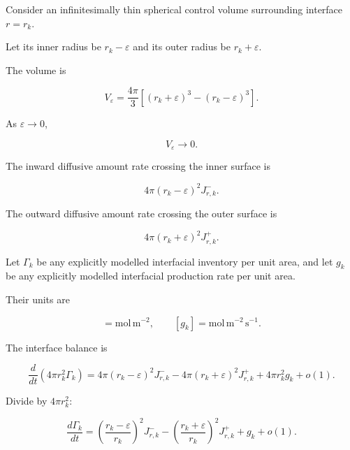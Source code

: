 \documentclass[11pt,a4paper]{article}
\begin{document}
Consider an infinitesimally thin spherical control volume surrounding interface $r=r_k$.

Let its inner radius be $r_k-\varepsilon$ and its outer radius be $r_k+\varepsilon$.

The volume is

\begin{equation}
V_\varepsilon
=
\frac{4\pi}{3}
\left[
(r_k+\varepsilon)^3-(r_k-\varepsilon)^3
\right].
\tag{TRISO-INT-100}
\label{eq:triso-int-100}
\end{equation}

As $\varepsilon\to0$,

\begin{equation}
V_\varepsilon\to0.
\tag{TRISO-INT-101}
\label{eq:triso-int-101}
\end{equation}

The inward diffusive amount rate crossing the inner surface is

\begin{equation}
4\pi(r_k-\varepsilon)^2J_{r,k}^{-}.
\tag{TRISO-INT-102}
\label{eq:triso-int-102}
\end{equation}

The outward diffusive amount rate crossing the outer surface is

\begin{equation}
4\pi(r_k+\varepsilon)^2J_{r,k}^{+}.
\tag{TRISO-INT-103}
\label{eq:triso-int-103}
\end{equation}

Let $\Gamma_k$ be any explicitly modelled interfacial inventory per unit area, and let $g_k$ be any explicitly modelled interfacial production rate per unit area.

Their units are

\begin{equation}
[\Gamma_k]=\mathrm{mol\,m^{-2}},
\qquad
[g_k]=\mathrm{mol\,m^{-2}\,s^{-1}}.
\tag{TRISO-INT-104}
\label{eq:triso-int-104}
\end{equation}

The interface balance is

\begin{equation}
\frac{d}{dt}
\left(
4\pi r_k^2\Gamma_k
\right)
=
4\pi(r_k-\varepsilon)^2J_{r,k}^{-}
-
4\pi(r_k+\varepsilon)^2J_{r,k}^{+}
+
4\pi r_k^2g_k
+
o(1).
\tag{TRISO-INT-105}
\label{eq:triso-int-105}
\end{equation}

Divide by $4\pi r_k^2$:

\begin{equation}
\frac{d\Gamma_k}{dt}
=
\left(
\frac{r_k-\varepsilon}{r_k}
\right)^2
J_{r,k}^{-}
-
\left(
\frac{r_k+\varepsilon}{r_k}
\right)^2
J_{r,k}^{+}
+
g_k
+
o(1).
\tag{TRISO-INT-106}
\label{eq:triso-int-106}
\end{equation}
\end{document}
